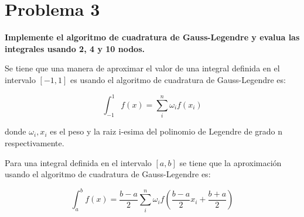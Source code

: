 \section*{Problema 3}

\textbf{Implemente el algoritmo de cuadratura de Gauss-Legendre y evalua las integrales usando 2, 4 y 10 nodos.}

Se tiene que una manera de aproximar el valor de una integral definida en el intervalo $[-1,1]$ es usando el algoritmo de cuadratura de Gauss-Legendre es:

\begin{equation}
    \int_{-1}^1 f(x) = \sum_i^n \omega_i f(x_i)
\end{equation}

donde $\omega_i,x_i$ es el peso y la raiz i-esima del polinomio de Legendre de grado n respectivamente.

Para una integral definida en el intervalo $[a,b]$ se tiene que la aproximación usando el algoritmo de cuadratura de Gauss-Legendre es:

\begin{equation}
    \int_{a}^b f(x) = \frac{b-a}{2} \sum_i^n \omega_i f\left (\frac{b-a}{2}x_i+\frac{b+a}{2} \right ) \label{eq:problema3}
\end{equation}

